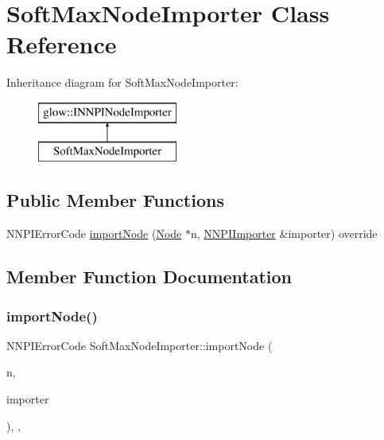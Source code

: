 \hypertarget{class_soft_max_node_importer}{}\section{Soft\+Max\+Node\+Importer Class Reference}
\label{class_soft_max_node_importer}
Inheritance diagram for Soft\+Max\+Node\+Importer\+:\begin{figure}[H]
\begin{center}
\leavevmode
\includegraphics[height=2.000000cm]{class_soft_max_node_importer}
\end{center}
\end{figure}
\subsection*{Public Member Functions}
\begin{DoxyCompactItemize}
\item 
N\+N\+P\+I\+Error\+Code \hyperlink{class_soft_max_node_importer_a9fb48b55dbe0a52f8cd8b6e0e9b55d4f}{import\+Node} (\hyperlink{classglow_1_1_node}{Node} $\ast$n, \hyperlink{classglow_1_1_n_n_p_i_importer}{N\+N\+P\+I\+Importer} \&importer) override
\end{DoxyCompactItemize}


\subsection{Member Function Documentation}
\mbox{\label{class_soft_max_node_importer_a9fb48b55dbe0a52f8cd8b6e0e9b55d4f}} 
\subsubsection{\texorpdfstring{import\+Node()}{importNode()}}
{\footnotesize\ttfamily N\+N\+P\+I\+Error\+Code Soft\+Max\+Node\+Importer\+::import\+Node (\begin{DoxyParamCaption}\item[{\hyperlink{classglow_1_1_node}{Node} $\ast$}]{n,  }\item[{\hyperlink{classglow_1_1_n_n_p_i_importer}{N\+N\+P\+I\+Importer} \&}]{importer }\end{DoxyParamCaption})\hspace{0.3cm}{\ttfamily [inline]}, {\ttfamily [override]}, {\ttfamily [virtual]}}

